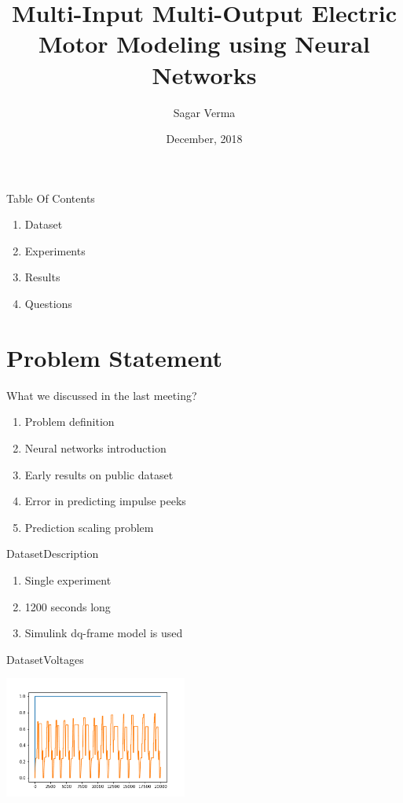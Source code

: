 \documentclass[handout]{beamer}
\title[ \insertdate]{Multi-Input Multi-Output Electric Motor Modeling using Neural Networks}
\author{Sagar Verma}
\institute[Centralesup\'elec and Schneider Electric] %
{
  Centre de Vision Num\'erique,\\
  Centralesup\'elec, Gif-sur-Yvette}
\date{December, 2018}
\begin{document}
\begin{frame}
\titlepage
\end{frame}

\begin{frame}{Table Of Contents}
\begin{enumerate}
\item Dataset
\item Experiments
\item Results
\item Questions
\end{enumerate}
\end{frame}

\section{Problem Statement}

\begin{frame}{What we discussed in the last meeting?}
\begin{enumerate}
  \item Problem definition
  \item Neural networks introduction
  \item Early results on public dataset
  \item Error in predicting impulse peeks
  \item Prediction scaling problem
\end{enumerate}
\end{frame}


\begin{frame}{Dataset}{Description}
  \begin{enumerate}
    \item Single experiment
    \item 1200 seconds long
    \item Simulink dq-frame model is used
  \end{enumerate}
\end{frame}

\begin{frame}{Dataset}{Voltages}
\begin{center}
  \includegraphics[width=0.8\linewidth, height=4cm]{images/voltages}
\end{center}
\end{frame}
\end{document}
